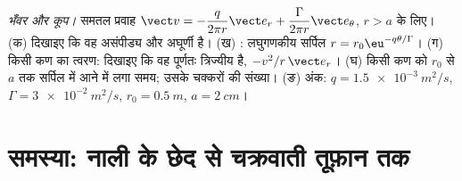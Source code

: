 \begin{exercise}[$\star\star\star$]\label{exo:b2:fluid-kinematics:12}
\emph{भँवर और कूप।} समतल प्रवाह $\vect v = -\dfrac{q}{2\pi r}\vect e_r +
\dfrac{\Gamma}{2\pi r}\vect e_\theta$, $r > a$ के लिए। (क) दिखाइए कि वह
असंपीड्य और अघूर्णी है। (ख) : लघुगणकीय सर्पिल
$r = r_0\eu^{-q\theta/\Gamma}$। (ग) किसी कण का त्वरण: दिखाइए कि वह
पूर्णतः त्रिज्यीय है, $-v^2/r\,\vect e_r$। (घ) किसी कण को $r_0$ से $a$ तक
सर्पिल में आने में लगा समय; उसके चक्करों की संख्या। (ङ) अंक: $q =
\qty{1.5e-3}{m^2/s}$, $\Gamma = \qty{3e-2}{m^2/s}$, $r_0 = \qty{0.5}{m}$,
$a = \qty{2}{cm}$।
\end{exercise}

\section{समस्या: नाली के छेद से चक्रवाती तूफ़ान तक}

